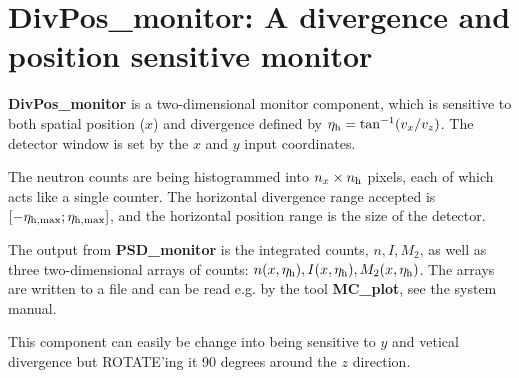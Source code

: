 
\section{DivPos\_monitor: A divergence and position sensitive monitor}

{\bf DivPos\_monitor} is a two-dimensional monitor component,
which is sensitive to both spatial position ($x$) and divergence
defined by $\eta_{\rm h} = \tan^{-1}(v_x/v_z)$.
The detector window is set
by the $x$ and $y$ input coordinates.

The neutron counts are being histogrammed
into $n_x \times n_{\rm h}$ pixels, each of which acts like a single
counter. The horizontal divergence range accepted is
$[-\eta_{\rm h,max}; \eta_{\rm h,max}]$, and the horizontal position
range is the size of the detector.

The output from {\bf PSD\_monitor} is the integrated counts, $n, I, M_2$,
as well as
three two-dimensional arrays of counts: $n(x,\eta_{\rm h}),
I(x,\eta_{\rm h}), M_2(x,\eta_{\rm h})$.
The arrays are written to a file and can be read e.g. by the tool
{\bf MC\_plot}, see the system manual.

This component can easily be change into being sensitive
to $y$ and vetical divergence but ROTATE'ing it
90 degrees around the $z$ direction.